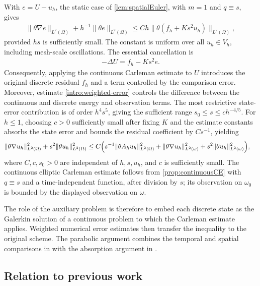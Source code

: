 \documentclass[print,wide,eng]{draft}
\begin{document}
With $e=U-u_h$, the static case of \cref{lem:spatialEuler}, with $m=1$ and $q\equiv s$, gives
\begin{align}\label{intro:weighted-error}
\|\theta\nabla e\|_{L^2(\Omega)}
+h^{-1}\|\theta e\|_{L^2(\Omega)}
\leq Ch\|\theta(f_h+Ks^2u_h)\|_{L^2(\Omega)},
\end{align}
provided $hs$ is sufficiently small. The constant is uniform over all $u_h\in V_h$, including mesh-scale oscillations. The essential cancellation is
%
\begin{align}\label{intro:poisson-residual}
-\Delta U=f_h-Ks^2e.
\end{align}
%
Consequently, applying the continuous Carleman estimate to $U$ introduces the original discrete residual $f_h$ and a term controlled by the comparison error. Moreover, estimate \cref{intro:weighted-error} controls the difference between the continuous and discrete energy and observation terms. The most restrictive state-error contribution is of order $h^4s^5$, giving the sufficient range $s_0\leq s\leq ch^{-4/5}$. For $h\leq1$, choosing $c>0$ sufficiently small after fixing $K$ and the estimate constants absorbs the state error and bounds the residual coefficient by $Cs^{-1}$, yielding
%
\begin{align}\label{intro:discrete-carleman}
\|\theta\nabla u_h\|_{L^2(\Omega)}^2
+s^2\|\theta u_h\|_{L^2(\Omega)}^2
&\leq C\Bigl(s^{-1}\|\theta A_hu_h\|_{L^2(\Omega)}^2
+\|\theta\nabla u_h\|_{L^2(\omega)}^2
+s^2\|\theta u_h\|_{L^2(\omega)}^2\Bigr),
\end{align}
%
where $C,c,s_0>0$ are independent of $h,s,u_h$, and $c$ is sufficiently small. The continuous elliptic Carleman estimate follows from \cref{prop:continuousCE} with $q\equiv s$ and a time-independent function, after division by $s$; its observation on $\omega_0$ is bounded by the displayed observation on $\omega$.

The role of the auxiliary problem is therefore to embed each discrete state as the Galerkin solution of a continuous problem to which the Carleman estimate applies. Weighted numerical error estimates then transfer the inequality to the original scheme. The parabolic argument combines the temporal and spatial comparisons in  with the absorption argument in .


\subsection{Relation to previous work}\label{intro:comparison}
\end{document}
